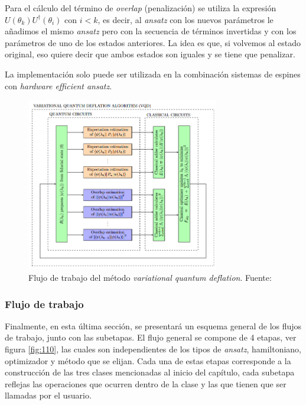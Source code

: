 Para el cálculo del término de \textit{overlap} (penalización) se utiliza la expresión $U(\theta_k)U^{\dag}(\theta_i)$ con $i<k$, es decir, al \textit{ansatz} con los nuevos parámetros le añadimos el mismo \textit{ansatz} pero con la secuencia de términos invertidas y con los parámetros de uno de los estados anteriores. La idea es que, si volvemos al estado original, eso quiere decir que ambos estados son iguales y se tiene que penalizar.

La implementación solo puede ser utilizada en la combinación sistemas de espines con \textit{hardware efficient ansatz}.
\begin{figure}[H]
\centering
\includegraphics[width=0.75\textwidth]{figures/S3/flujovqd.png}
\caption{\label{fig:102} Flujo de trabajo del método \textit{variational quantum deflation}. Fuente: \cite{Higgott2019variationalquantum}}
\end{figure}




\subsubsection{Flujo de trabajo}
Finalmente, en esta última sección, se presentará un esquema general de los flujos de trabajo, junto con las subetapas. El flujo general se compone de 4 etapas, ver figura \ref{fig:110}, las cuales son independientes de los tipos de \textit{ansatz}, hamiltoniano, optimizador y método que se elijan. Cada una de estas etapas corresponde a la construcción de las tres clases mencionadas al inicio del capítulo, cada subetapa reflejas las operaciones que ocurren dentro de la clase y las que tienen que ser llamadas por el usuario.

